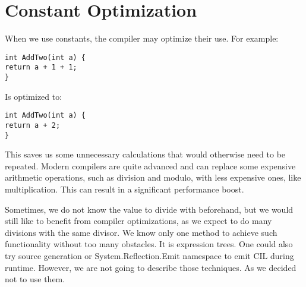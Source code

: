 \section{Constant Optimization}
When we use constants, the compiler may optimize their use. For example:

\begin{lstlisting}
int AddTwo(int a) {
return a + 1 + 1;
}
\end{lstlisting}

Is optimized to:

\begin{lstlisting}
int AddTwo(int a) {
return a + 2;
}
\end{lstlisting}

This saves us some unnecessary calculations that would otherwise need to be repeated. Modern compilers are quite advanced and can replace some expensive arithmetic operations, such as division and modulo, with less expensive ones, like multiplication. This can result in a significant performance boost.

Sometimes, we do not know the value to divide with beforehand, but we would still like to benefit from compiler optimizations, as we expect to do many divisions with the same divisor. We know only one method to achieve such functionality without too many obstacles. It is expression trees. One could also try source generation or System.Reflection.Emit namespace to emit CIL during runtime. However, we are not going to describe those techniques. As we decided not to use them.
